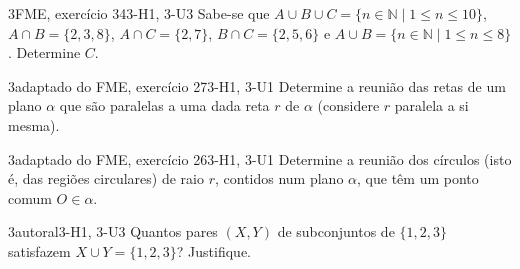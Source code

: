 \begin{questao}{3}{FME, exercício 34}{3-H1, 3-U3}\label{u3:fme34}
Sabe-se que $A\cup B\cup C=\{n\in\mathbb{N}\mid 1\le n\le10\}$, $A\cap B=\{2,3,8\}$, $A\cap C=\{2,7\}$, $B\cap C=\{2,5,6\}$ e $A\cup B=\{n\in\mathbb{N}\mid 1\le n\le8\}$. Determine $C$.
\end{questao}

\begin{questao}{3}{adaptado do FME, exercício 27}{3-H1, 3-U1}\label{u3:fme27}
Determine a reunião das retas de um plano $\alpha$ que são paralelas a uma dada reta $r$ de $\alpha$ (considere $r$ paralela a si mesma).
\end{questao}

\begin{questao}{3}{adaptado do FME, exercício 26}{3-H1, 3-U1}\label{u3:discos}
Determine a reunião dos círculos (isto é, das regiões circulares) de raio $r$, contidos num plano $\alpha$, que têm um ponto comum $O\in\alpha$.
\end{questao}

\begin{questao}{3}{autoral}{3-H1, 3-U3}\label{u3:pares}
Quantos pares $(X,Y)$ de subconjuntos de $\{1,2,3\}$ satisfazem $X\cup Y=\{1,2,3\}$? Justifique.
\end{questao}

